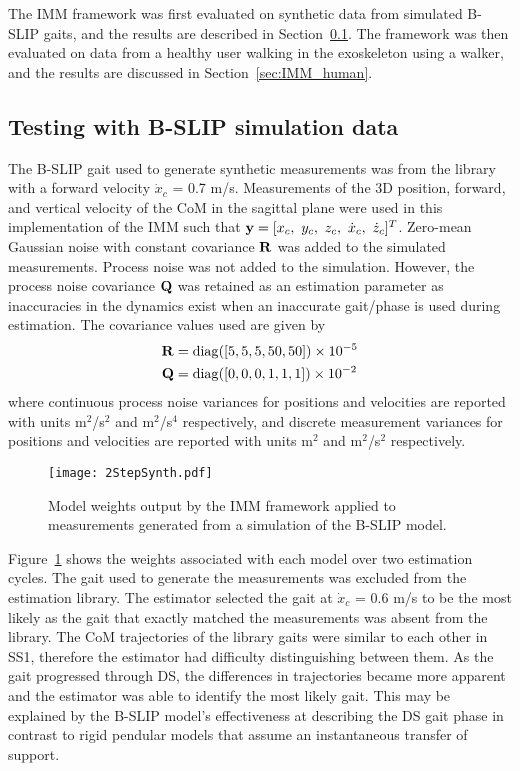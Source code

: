 The IMM framework was first evaluated on synthetic data from simulated B-SLIP gaits, and the results are described in Section~\ref{sec:IMM_syn}. The framework was then evaluated on data from a healthy user walking in the exoskeleton using a walker, and the results are discussed in Section~\ref{sec:IMM_human}.

\subsection{Testing with B-SLIP simulation data}\label{sec:IMM_syn}

The B-SLIP gait used to generate synthetic measurements was from the library with a forward velocity $ \dot{x}_c $ = 0.7 m/s. Measurements of the 3D position, forward, and vertical velocity of the CoM in the sagittal plane were used in this implementation of the IMM such that $ \mathbf{y} = [x_{c},\ y_{c},\ z_{c},\ \dot{x}_{c},\ \dot{z}_{c}]^T $. Zero-mean Gaussian noise with constant covariance $ \mathbf{R} $ was added to the simulated measurements. Process noise was not added to the simulation. However, the process noise covariance $ \mathbf{Q} $ was retained as an estimation parameter as inaccuracies in the dynamics exist when an inaccurate gait/phase is used during estimation. The covariance values used are given by
\begin{align}
	\mathbf{R} &= {\rm diag}([5 ,5 ,5  ,50 ,50]) 
\times 10^{-5} \\
\mathbf{Q} &={\rm diag}([0,0,0,1,1,1])
\times 10^{-2}
\end{align}
where continuous process noise variances for positions and velocities are reported with units m${}^2$/s${}^2$ and m${}^2$/s${}^4$ respectively, and discrete measurement variances for positions and velocities are reported with units m${}^2 $ and m${}^2$/s${}^2$ respectively. 

\begin{figure}
	\centering
	\texttt{[image: 2StepSynth.pdf]}
	\caption{Model weights output by the IMM framework applied to measurements generated from a simulation of the B-SLIP model.}\label{fig:weightSyn}
\end{figure}

Figure~\ref{fig:weightSyn} shows the weights associated with each model over two estimation cycles. The gait used to generate the measurements was excluded from the estimation library. The estimator selected the gait at $ \dot{x}_c $ = 0.6 m/s to be the most likely as the gait that exactly matched the measurements was absent from the library. The CoM trajectories of the library gaits were similar to each other in SS1, therefore the estimator had difficulty distinguishing between them. As the gait progressed through DS, the differences in trajectories became more apparent and the estimator was able to identify the most likely gait. This may be explained by the B-SLIP model's effectiveness at describing the DS gait phase in contrast to rigid pendular models that assume an instantaneous transfer of support.


